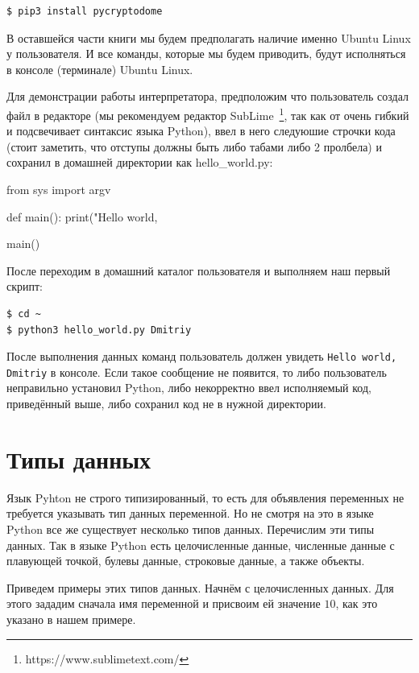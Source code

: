 \begin{verbatim}
$ pip3 install pycryptodome
\end{verbatim} 

В оставшейся части книги мы будем предполагать наличие именно Ubuntu Linux у 
пользователя. И все команды, которые мы будем приводить, будут исполняться в 
консоле (терминале) Ubuntu Linux.

Для демонстрации работы интерпретатора, предположим что пользователь создал
файл в редакторе (мы рекомендуем редактор SubLime~\footnote{https://www.sublimetext.com/}, 
так как от очень гибкий и подсвечивает синтаксис языка Python), ввел в него следуюшие строчки
кода (стоит заметить, что отступы должны быть либо табами либо 2 пролбела) и сохранил в 
домашней директории как hello\_world.py:

\begin{python}
from sys import argv

def main():
	print("Hello world, %

main()
\end{python}

После переходим в домашний каталог пользователя и выполняем наш первый скрипт:

\begin{verbatim}
$ cd ~
$ python3 hello_world.py Dmitriy
\end{verbatim}

После выполнения данных команд пользователь должен увидеть
\texttt{Hello world, Dmitriy} в консоле. Если такое сообщение не 
появится, то либо пользователь неправильно установил Python,
либо некорректно ввел исполняемый код, приведённый выше,
либо сохранил код не в нужной директории.

\section{Типы данных}

Язык Pyhton не строго типизированный, то есть для объявления
переменных не требуется указывать тип данных переменной. Но не смотря на
это в языке Python все же существует несколько типов данных.
Перечислим эти типы данных. Так в языке Python есть целочисленные данные,
численные данные с плавующей точкой, булевы данные, строковые данные, а 
также объекты.

Приведем примеры этих типов данных. Начнём с целочисленных данных. Для этого зададим 
сначала имя переменной и присвоим ей значение $10$, как это указано в нашем примере.

